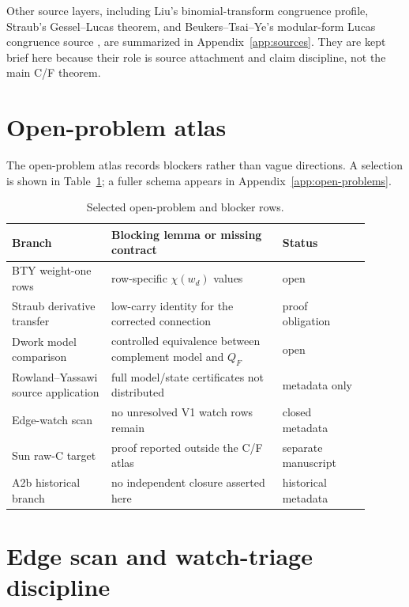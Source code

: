 \documentclass[11pt,a4paper]{article}
\begin{document}
Other source layers, including Liu's binomial-transform congruence profile,
Straub's Gessel--Lucas theorem, and Beukers--Tsai--Ye's modular-form Lucas
congruence source
\cite{liu_2025_binomial_transforms,straub_2024_gessel_lucas,beukers_tsai_ye_2025_lucas},
are summarized in Appendix~\ref{app:sources}.  They are kept brief here
because their role is source attachment and claim discipline, not the main
C/F theorem.

\section{Open-problem atlas}
\label{sec:open-problems}

The open-problem atlas records blockers rather than vague directions.  A
selection is shown in Table~\ref{tab:open-problems}; a fuller schema appears
in Appendix~\ref{app:open-problems}.

\begin{table}[htbp]
\centering
\small
\begin{tabular}{p{0.25\linewidth}p{0.43\linewidth}p{0.22\linewidth}}
\hline
Branch & Blocking lemma or missing contract & Status\\
\hline
BTY weight-one rows & row-specific $\chi(w_d)$ values & open\\
Straub derivative transfer & low-carry identity for the corrected connection & proof obligation\\
Dwork model comparison & controlled equivalence between complement model and $Q_F$ & open\\
Rowland--Yassawi source application & full model/state certificates not distributed & metadata only\\
Edge-watch scan & no unresolved V1 watch rows remain & closed metadata\\
Sun raw-C target & proof reported outside the C/F atlas & separate manuscript\\
A2b historical branch & no independent closure asserted here & historical metadata\\
\hline
\end{tabular}
\caption{Selected open-problem and blocker rows.}
\label{tab:open-problems}
\end{table}

\section{Edge scan and watch-triage discipline}
\label{sec:edge-scan}
\end{document}
